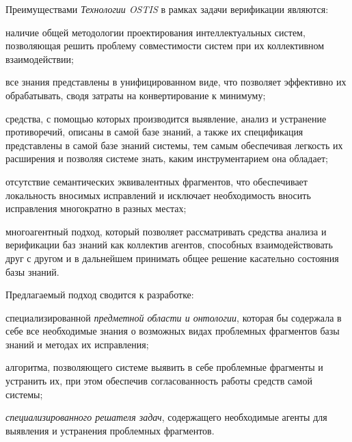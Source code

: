 Преимуществами \textit{Технологии OSTIS} в рамках задачи верификации являются:
\begin{textitemize}
   \item наличие общей методологии проектирования интеллектуальных систем, позволяющая решить проблему совместимости систем при их коллективном взаимодействии;
   \item все знания представлены в унифицированном виде, что позволяет эффективно их обрабатывать, сводя затраты на конвертирование к минимуму;
   \item средства, с помощью которых производится выявление, анализ и устранение противоречий, описаны в самой базе знаний, а также их спецификация представлены в самой базе знаний системы, тем самым обеспечивая легкость их расширения и позволяя системе знать, каким инструментарием она обладает;
   \item отсутствие семантических эквивалентных фрагментов, что обеспечивает локальность вносимых исправлений и исключает необходимость вносить исправления многократно в разных местах;
   \item многоагентный подход, который позволяет рассматривать средства анализа и верификации баз знаний как коллектив агентов, способных взаимодействовать друг с другом и в дальнейшем принимать общее решение касательно состояния базы знаний. 
\end{textitemize}

Предлагаемый подход сводится к разработке:
\begin{textitemize}
    \item специализированной \textit{предметной области и онтологии}, которая бы содержала в себе все необходимые знания о возможных видах проблемных фрагментов базы знаний и методах их исправления;
    \item алгоритма, позволяющего системе выявить в себе проблемные фрагменты и устранить их, при этом обеспечив согласованность работы средств самой системы;
    \item \textit{специализированного решателя задач}, содержащего необходимые агенты для выявления и устранения проблемных фрагментов.
\end{textitemize}

